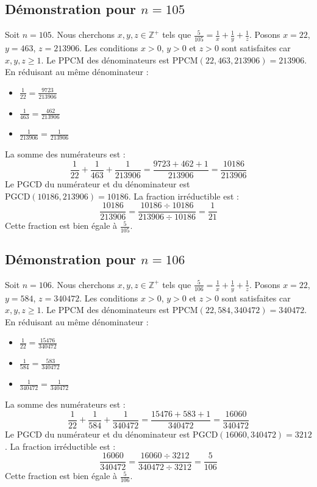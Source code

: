 \documentclass[11pt,a4paper]{article}
\begin{document}
\subsection{Démonstration pour $n = 105$}
Soit $n = 105$. Nous cherchons $x, y, z \in \mathbb{Z}^{+}$ tels que $\frac{5}{105} = \frac{1}{x} + \frac{1}{y} + \frac{1}{z}$.
Posons $x = 22$, $y = 463$, $z = 213906$.
Les conditions $x > 0$, $y > 0$ et $z > 0$ sont satisfaites car $x, y, z \geq 1$.
Le PPCM des dénominateurs est $\text{PPCM}(22, 463, 213906) = 213906$.
En réduisant au même dénominateur :
\begin{itemize}
    \item $\frac{1}{22} = \frac{9723}{213906}$
    \item $\frac{1}{463} = \frac{462}{213906}$
    \item $\frac{1}{213906} = \frac{1}{213906}$
\end{itemize}
La somme des numérateurs est :
$$ \frac{1}{22} + \frac{1}{463} + \frac{1}{213906} = \frac{9723 + 462 + 1}{213906} = \frac{10186}{213906} $$
Le PGCD du numérateur et du dénominateur est $\text{PGCD}(10186, 213906) = 10186$.
La fraction irréductible est :
$$ \frac{10186}{213906} = \frac{10186 \div 10186}{213906 \div 10186} = \frac{1}{21} $$
Cette fraction est bien égale à $\frac{5}{105}$.

\subsection{Démonstration pour $n = 106$}
Soit $n = 106$. Nous cherchons $x, y, z \in \mathbb{Z}^{+}$ tels que $\frac{5}{106} = \frac{1}{x} + \frac{1}{y} + \frac{1}{z}$.
Posons $x = 22$, $y = 584$, $z = 340472$.
Les conditions $x > 0$, $y > 0$ et $z > 0$ sont satisfaites car $x, y, z \geq 1$.
Le PPCM des dénominateurs est $\text{PPCM}(22, 584, 340472) = 340472$.
En réduisant au même dénominateur :
\begin{itemize}
    \item $\frac{1}{22} = \frac{15476}{340472}$
    \item $\frac{1}{584} = \frac{583}{340472}$
    \item $\frac{1}{340472} = \frac{1}{340472}$
\end{itemize}
La somme des numérateurs est :
$$ \frac{1}{22} + \frac{1}{584} + \frac{1}{340472} = \frac{15476 + 583 + 1}{340472} = \frac{16060}{340472} $$
Le PGCD du numérateur et du dénominateur est $\text{PGCD}(16060, 340472) = 3212$.
La fraction irréductible est :
$$ \frac{16060}{340472} = \frac{16060 \div 3212}{340472 \div 3212} = \frac{5}{106} $$
Cette fraction est bien égale à $\frac{5}{106}$.
\end{document}

